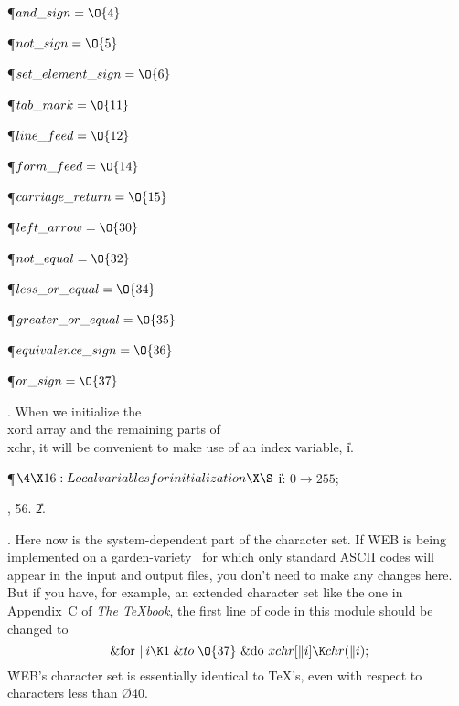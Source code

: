 \Y\P\D {}$\\{and\_sign}=\O{4}$\par
\P\D {}$\\{not\_sign}=\O{5}$\par
\P\D {}$\\{set\_element\_sign}=\O{6}$\par
\P\D {}$\\{tab\_mark}=\O{11}$\par
\P\D {}$\\{line\_feed}=\O{12}$\par
\P\D {}$\\{form\_feed}=\O{14}$\par
\P\D {}$\\{carriage\_return}=\O{15}$\par
\P\D {}$\\{left\_arrow}=\O{30}$\par
\P\D {}$\\{not\_equal}=\O{32}$\par
\P\D {}$\\{less\_or\_equal}=\O{34}$\par
\P\D {}$\\{greater\_or\_equal}=\O{35}$\par
\P\D {}$\\{equivalence\_sign}=\O{36}$\par
\P\D {}$\\{or\_sign}=\O{37}$\par
\fi

. When we initialize the \\{xord} array and the remaining parts of %
\\{xchr},
it will be convenient to make use of an index variable, \|i.

\Y\P$\4\X16:Local variables for initialization\X\S$\6
\4\|i: $0\to255$;\par
{}, 56.
\U2.\fi

. Here now is the system-dependent part of the character set.
If \.{WEB} is being implemented on a garden-variety \PASCAL\ for which
only standard ASCII codes will appear in the input and output files, you
don't need to make any changes here. But if you have, for example, an extended
character set like the one in Appendix~C of {\sl The \TeX book}, the first
line of code in this module should be changed to
$$\hbox{ \&{for} $\|i\K1\mathrel{\&{to}}\O{37}$ \&{do} $\\{xchr}[\|i]\K\\{chr}(%
\|i)$;}$$
\.{WEB}'s character set is essentially identical to \TeX's, even with respect
to
characters less than \O{40}.

